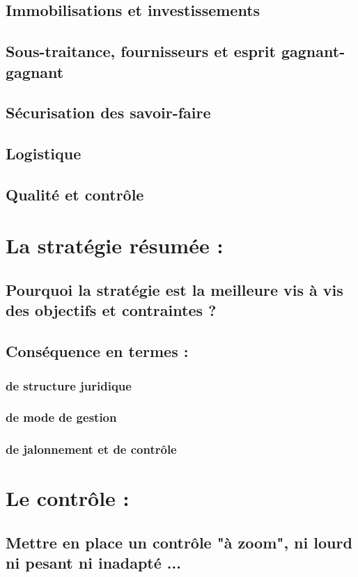 	\subsection{Immobilisations et investissements}
	\subsection{Sous-traitance, fournisseurs et esprit gagnant-gagnant}
	\subsection{Sécurisation des savoir-faire}
	\subsection{Logistique}
	\subsection{Qualité et contrôle}

\section{La stratégie résumée :}
	\subsection{Pourquoi la stratégie est la meilleure vis à vis des objectifs et contraintes ?}
	\subsection{Conséquence en termes :}
		\subsubsection{de structure juridique}
		\subsubsection{de mode de gestion}
		\subsubsection{de jalonnement et de contrôle}

\section{Le contrôle :}
	\subsection{Mettre en place un contrôle "à zoom", ni lourd ni pesant ni inadapté ...}
